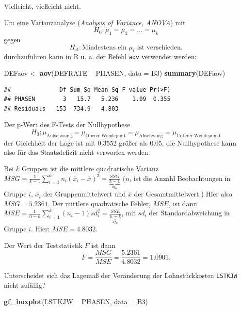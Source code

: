 \documentclass[12pt,ngerman,paper=a4,pagesize,DIV=13]{scrreprt}
\newenvironment{Shaded}{\begin{snugshade}}{\end{snugshade}}
\newcommand{\DataTypeTok}[1]{\textcolor[rgb]{0.13,0.29,0.53}{#1}}
\newcommand{\KeywordTok}[1]{\textcolor[rgb]{0.13,0.29,0.53}{\textbf{#1}}}
\newcommand{\NormalTok}[1]{#1}
\newcommand{\OperatorTok}[1]{\textcolor[rgb]{0.81,0.36,0.00}{\textbf{#1}}}
\newcommand{\StringTok}[1]{\textcolor[rgb]{0.31,0.60,0.02}{#1}}
\begin{document}
Vielleicht, vielleicht nicht.

Um eine Varianzanalyse (\emph{Analysis of Variance, ANOVA}) mit
\[H_0: \mu_1=\mu_2=\ldots =\mu_k\] gegen
\[H_A: \text{Mindestens ein } \mu_i \text{ ist verschieden.}\]
durchzuführen kann in R u. a. der Befehl \texttt{aov} verwendet werden:

\begin{Shaded}
\begin{Highlighting}[]
\NormalTok{DEFaov <-}\StringTok{ }\KeywordTok{aov}\NormalTok{(DEFRATE }\OperatorTok{~}\StringTok{ }\NormalTok{PHASEN, }\DataTypeTok{data =}\NormalTok{ B3)}
\KeywordTok{summary}\NormalTok{(DEFaov)}
\end{Highlighting}
\end{Shaded}

\begin{verbatim}
##              Df Sum Sq Mean Sq F value Pr(>F)
## PHASEN        3   15.7   5.236    1.09  0.355
## Residuals   153  734.9   4.803
\end{verbatim}

Der p-Wert des F-Tests der Nullhypothese
\[H_0: \mu_{\text{Aufschwung}}=\mu_{\text{Oberer Wendepunt}}=\mu_{\text{Abschwung}}=\mu_{\text{Unterer Wendepunkt}}\]
der Gleichheit der Lage ist mit 0.3552 größer als 0.05, die
Nullhypothese kann also für das Staatsdefizit nicht verworfen werden.

Bei \(k\) Gruppen ist die mittlere quadratische Varianz
\(MSG=\frac{1}{k-1}\sum_{i=1}^k n_i (\bar{x}_i- \bar{x})^2=\frac{SSG}{\underbrace{k-1}_{df_G}}\)
(\(n_i\) ist die Anzahl Beobachtungen in Gruppe \(i\), \(\bar{x}_i\) der
Gruppenmittelwert und \(\bar{x}\) der Gesamtmittelwert.) Hier also
\(MSG=5.2361\). Der mittlere quadratische Fehler, \(MSE\), ist dann
\(MSE=\frac{1}{n-k} \sum_{i=1}^k (n_i-1) sd^2_i=\frac{SSE}{\underbrace{n-k}_{df_E}}\),
mit \(sd_i\) der Standardabweichung in Gruppe \(i\). Hier:
\(MSE=4.8032\).

Der Wert der Teststatistik \(F\) ist dann
\[F=\frac{MSG}{MSE}=\frac{5.2361}{4.8032}=1.0901.\]

Unterscheidet sich das Lagemaß der Veränderung der Lohnstückkosten
\texttt{LSTKJW} nicht zufällig?

\begin{Shaded}
\begin{Highlighting}[]
\KeywordTok{gf_boxplot}\NormalTok{(LSTKJW }\OperatorTok{~}\StringTok{ }\NormalTok{PHASEN, }\DataTypeTok{data =}\NormalTok{ B3)}
\end{Highlighting}
\end{Shaded}
\end{document}
